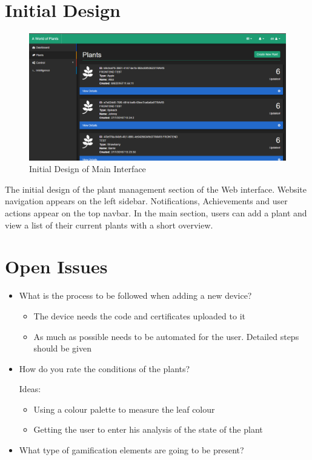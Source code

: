 \documentclass{article}
\begin{document}
\section{Initial Design}
\begin{figure}[H]
 	\includegraphics[width=\textwidth]{images/initial-design.PNG}
  	\caption{Initial Design of Main Interface}
\end{figure}

The initial design of the plant management section of the Web interface. Website navigation appears on the left sidebar. Notifications, Achievements and user actions appear on the top navbar. In the main section, users can add a plant and view a list of their current plants with a short overview.

\section{Open Issues}
\begin{itemize}
	\item What is the process to be followed when adding a new device?
	
	\begin{itemize}
		\item The device needs the code and certificates uploaded to it
		\item As much as possible needs to be automated for the user. Detailed steps should be given
	\end{itemize}

	\item How do you rate the conditions of the plants?
	
	Ideas:
	\begin{itemize}
		\item Using a colour palette to measure the leaf colour
		\item Getting the user to enter his analysis of the state of the plant
	\end{itemize}
	
	\item What type of gamification elements are going to be present?
\end{itemize}
\end{document}
